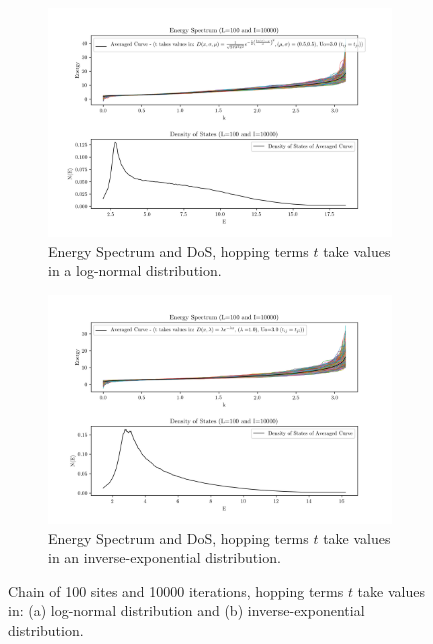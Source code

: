 \documentclass[12pt]{article}
\begin{document}
\begin{figure}[ht]
		\centering
        \begin{subfigure}[a]{\textwidth}
        		\centering
                \includegraphics[scale=0.65]{EDOSRoCL.png}
                \caption{Energy Spectrum and DoS, hopping terms $t$ take values in a log-normal distribution.}
                \label{f5a}
        \end{subfigure}
        \begin{subfigure}[b]{\textwidth}
        		\centering
                \includegraphics[scale=0.65]{EDOSRoCE.png}
                \caption{ Energy Spectrum and DoS, hopping terms $t$ take values in an inverse-exponential distribution.}
                \label{f5b}
        \end{subfigure}
        \caption{Chain of 100 sites and 10000 iterations, hopping terms $t$ take values in: (a) log-normal distribution and (b)  inverse-exponential distribution.}
        \label{f5}
\end{figure}
\end{document}
